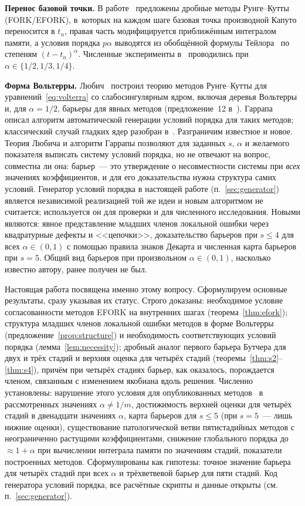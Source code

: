 \documentclass[11pt,a4paper]{article}
\theoremstyle{plain}
\theoremstyle{definition}
\begin{document}
\textbf{Перенос базовой точки.} В работе~\cite{Ghaffari2023} предложены дробные методы Рунге--Кутты (FORK/\allowbreak EFORK), в~которых на каждом шаге базовая точка производной Капуто переносится в $t_n$, правая часть модифицируется приближённым интегралом памяти, а условия порядка $p\alpha$ выводятся из обобщённой формулы Тейлора~\cite{OdibatShawagfeh2007} по степеням $(t-t_n)^{\alpha}$. Численные эксперименты в~\cite{Ghaffari2023} проводились при $\alpha\in\{1/2,1/3,1/4\}$.

\textbf{Форма Вольтерры.} Любич~\cite{Lubich1983} построил теорию методов Рунге--Кутты для уравнений~\eqref{eq:volterra} со слабосингулярным ядром, включая деревья Вольтерры и, для $\alpha=1/2$, барьеры для явных методов (предложение~12 в~\cite{Lubich1983}). Гаррапа~\cite{Garrappa2010} описал алгоритм автоматической генерации условий порядка для таких методов; классический случай гладких ядер разобран в~\cite{BHN1982}. Разграничим известное и новое. Теория Любича и алгоритм Гаррапы позволяют для заданных $s$, $\alpha$ и желаемого показателя выписать систему условий порядка, но не отвечают на вопрос, совместна ли она: барьер~--- это утверждение о несовместности системы при \emph{всех} значениях коэффициентов, и для его доказательства нужна структура самих условий. Генератор условий порядка в настоящей работе (п.~\ref{sec:generator}) является независимой реализацией той же идеи и новым алгоритмом не считается; используется он для проверки и для численного исследования. Новыми являются: явное представление младших членов локальной ошибки через квадратурные дефекты и <<цепочки>>, доказательство барьеров при $s\le4$ для всех $\alpha\in(0,1)$ с помощью правила знаков Декарта и численная карта барьеров при $s=5$. Общий вид барьеров при произвольном $\alpha\in(0,1)$, насколько известно автору, ранее получен не был.

Настоящая работа посвящена именно этому вопросу. Сформулируем основные результаты, сразу указывая их статус. Строго доказаны: необходимое условие согласованности методов EFORK на внутренних шагах (теорема~\ref{thm:efork}); структура младших членов локальной ошибки методов в форме Вольтерры (предложение~\ref{prop:structure}) и необходимость соответствующих условий порядка (лемма~\ref{lem:necessity}); дробный аналог первого барьера Бутчера для двух и трёх стадий и верхняя оценка для четырёх стадий (теоремы~\ref{thm:s2}--\ref{thm:s4}), причём при четырёх стадиях барьер, как оказалось, порождается членом, связанным с изменением якобиана вдоль решения. Численно установлены: нарушение этого условия для опубликованных методов~\cite{Ghaffari2023} в рассмотренных значениях $\alpha\ne1/m$, достижимость верхней оценки для четырёх стадий в двенадцати значениях $\alpha$, карта барьеров для $s\le5$ (при $s=5$~--- лишь нижние оценки), существование патологической ветви пятистадийных методов с неограниченно растущими коэффициентами, снижение глобального порядка до $\approx1+\alpha$ при вычислении интеграла памяти по значениям стадий, показатели построенных методов. Сформулированы как гипотезы: точное значение барьера для четырёх стадий при всех $\alpha$ и трёхветвевой барьер для пяти стадий. Код генератора условий порядка, все расчётные скрипты и данные открыты (см. п.~\ref{sec:generator}).
\end{document}
